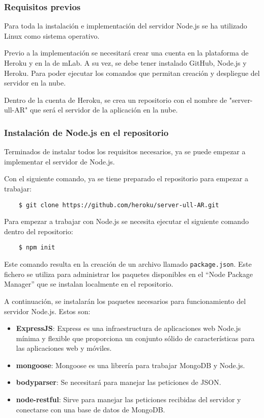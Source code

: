 \subsubsection{Requisitos previos}
Para toda la instalación e implementación del servidor Node.js se ha utilizado Linux como sistema operativo.

Previo a la implementación se necesitará crear una cuenta en la plataforma de Heroku y en la de mLab. A su vez, se debe tener instalado GitHub, Node.js y Heroku. Para poder ejecutar los comandos que permitan creación y despliegue del servidor en la nube.

Dentro de la cuenta de Heroku, se crea un repositorio con el nombre de "server-ull-AR" que será el servidor de la aplicación en la nube.

\subsubsection{Instalación de Node.js en el repositorio}

Terminados de instalar todos los requisitos necesarios, ya se puede empezar a implementar el servidor de Node.js.

Con el siguiente comando, ya se tiene preparado el repositorio para empezar a trabajar:

\begin{lstlisting}
    $ git clone https://github.com/heroku/server-ull-AR.git
\end{lstlisting}

Para empezar a trabajar con Node.js se necesita ejecutar el siguiente comando dentro del repositorio:

\begin{lstlisting}
    $ npm init 
\end{lstlisting}

Este comando resulta en la creación de un archivo llamado \texttt{package.json}. Este fichero se utiliza para administrar los paquetes disponibles en el ``Node Package Manager'' que se instalan localmente en el repositorio.

A continuación, se instalarán los paquetes necesarios para funcionamiento del servidor Node.js. Estos son:

\begin{itemize}
    \item \textbf{ExpressJS}: Express es una infraestructura de aplicaciones web Node.js mínima y flexible que proporciona un conjunto sólido de características para las aplicaciones web y móviles.
    \item \textbf{mongoose}: Mongoose es una librería para trabajar MongoDB y Node.js.
    \item \textbf{bodyparser}: Se necesitará para manejar las peticiones de JSON.
    \item \textbf{node-restful}: Sirve para manejar las peticiones recibidas del servidor y conectarse con una base de datos de MongoDB.
\end{itemize}

